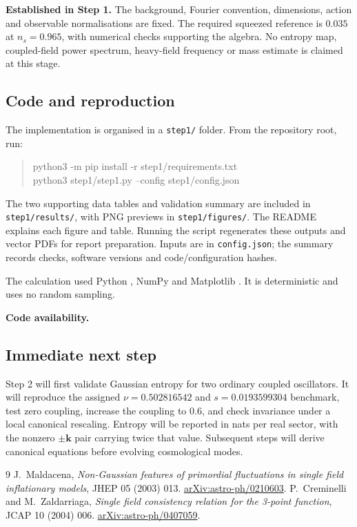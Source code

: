 \documentclass[11pt,a4paper]{article}
\begin{document}
\textbf{Established in Step 1.} The background, Fourier convention, dimensions, action and observable normalisations are fixed. The required squeezed reference is $0.035$ at $n_s=0.965$, with numerical checks supporting the algebra. No entropy map, coupled-field power spectrum, heavy-field frequency or mass estimate is claimed at this stage.

\subsection{Code and reproduction}
The implementation is organised in a \texttt{step1/} folder. From the repository root, run:
\begin{quote}\small\ttfamily
python3 -m pip install -r step1/requirements.txt\\
python3 step1/step1.py --config step1/config.json
\end{quote}
The two supporting data tables and validation summary are included in \texttt{step1/results/}, with PNG previews in \texttt{step1/figures/}. The README explains each figure and table. Running the script regenerates these outputs and vector PDFs for report preparation. Inputs are in \texttt{config.json}; the summary records checks, software versions and code/configuration hashes.

The calculation used Python \PythonVersion{}, NumPy \NumpyVersion{} and Matplotlib \MatplotlibVersion{}. It is deterministic and uses no random sampling.

\textbf{Code availability.} \RepositoryLine

\subsection{Immediate next step}
Step 2 will first validate Gaussian entropy for two ordinary coupled oscillators. It will reproduce the assigned $\nu=0.502816542$ and $s=0.0193599304$ benchmark, test zero coupling, increase the coupling to $0.6$, and check invariance under a local canonical rescaling. Entropy will be reported in nats per real sector, with the nonzero $\pm\bm{k}$ pair carrying twice that value. Subsequent steps will derive canonical equations before evolving cosmological modes.


\begin{thebibliography}{9}\small
{} J.~Maldacena, \emph{Non-Gaussian features of primordial fluctuations in single field inflationary models}, JHEP 05 (2003) 013. \href{https://arxiv.org/abs/astro-ph/0210603}{arXiv:astro-ph/0210603}.
 P.~Creminelli and M.~Zaldarriaga, \emph{Single field consistency relation for the 3-point function}, JCAP 10 (2004) 006. \href{https://arxiv.org/abs/astro-ph/0407059}{arXiv:astro-ph/0407059}.
\end{thebibliography}
\end{document}
